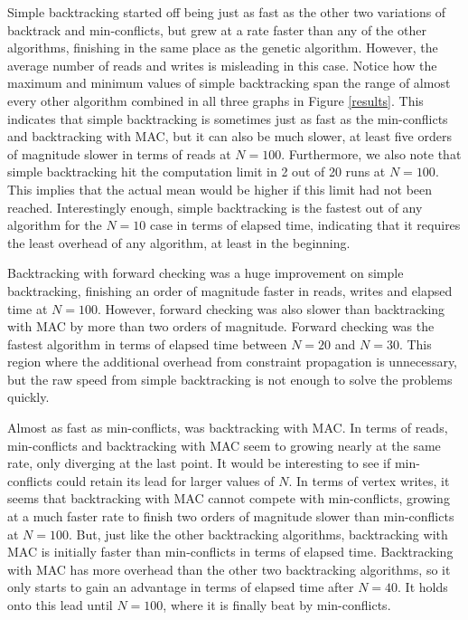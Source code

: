 \documentclass{article}
\begin{document}
		Simple backtracking started off being just as fast as the other two variations of backtrack and min-conflicts, but grew at a rate faster than any of the other algorithms, finishing in the same place as the genetic algorithm. However, the average number of reads and writes is misleading in this case. Notice how the maximum and minimum values of simple backtracking span the range of almost every other algorithm combined in all three graphs in Figure \ref{results}. This indicates that simple backtracking is sometimes just as fast as the min-conflicts and backtracking with MAC, but it can also be much slower, at least five orders of magnitude slower in terms of reads at $N=100$. Furthermore, we also note that simple backtracking hit the computation limit in 2 out of 20 runs at $N=100$. This implies that the actual mean would be higher if this limit had not been reached. Interestingly enough, simple backtracking is the fastest out of any algorithm for the $N=10$ case in terms of elapsed time, indicating that it requires the least overhead of any algorithm, at least in the beginning.
		
		Backtracking with forward checking was a huge improvement on simple backtracking, finishing an order of magnitude faster in reads, writes and elapsed time at $N=100$. However, forward checking was also slower than backtracking with MAC by more than two orders of magnitude. Forward checking was the fastest algorithm in terms of elapsed time between $N=20$ and $N=30$. This region where the additional overhead from constraint propagation is unnecessary, but the raw speed from simple backtracking is not enough to solve the problems quickly.
	
		Almost as fast as min-conflicts, was backtracking with MAC. In terms of reads, min-conflicts and backtracking with MAC seem to growing nearly at the same rate, only diverging at the last point. It would be interesting to see if min-conflicts could retain its lead for larger values of $N$. In terms of vertex writes, it seems that backtracking with MAC cannot compete with min-conflicts, growing at a much faster rate to finish two orders of magnitude slower than min-conflicts at $N=100$. But, just like the other backtracking algorithms, backtracking with MAC is initially faster than min-conflicts in terms of elapsed time. Backtracking with MAC has more overhead than the other two backtracking algorithms, so it only starts to gain an advantage in terms of elapsed time after $N=40$. It holds onto this lead until $N=100$, where it is finally beat by min-conflicts.
		
\end{document}
